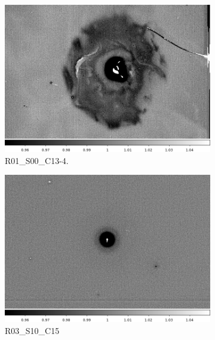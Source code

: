 \begin{figure}[!htbp]
\centering
 \begin{subfigure}{0.3\textwidth}
     \includegraphics[width=\textwidth]{figures/vamp_desc/vamp_desc_ffresp_R01S00.png}
     \caption{R01\_S00\_C13-4.}
     \label{subfig:vamp_desc_R01_S00}
 \end{subfigure}
 \begin{subfigure}{0.3\textwidth}
 \vskip 0pt
     \includegraphics[width=\textwidth]{figures/vamp_desc/vamp_desc_ffresp_R03S10.png}
     \caption{R03\_S10\_C15}
     \label{subfig:vamp_desc_R03_S10}
 \end{subfigure}
 \begin{subfigure}{0.3\textwidth}
 \vskip 0pt

\end{subfigure}
\end{figure}

